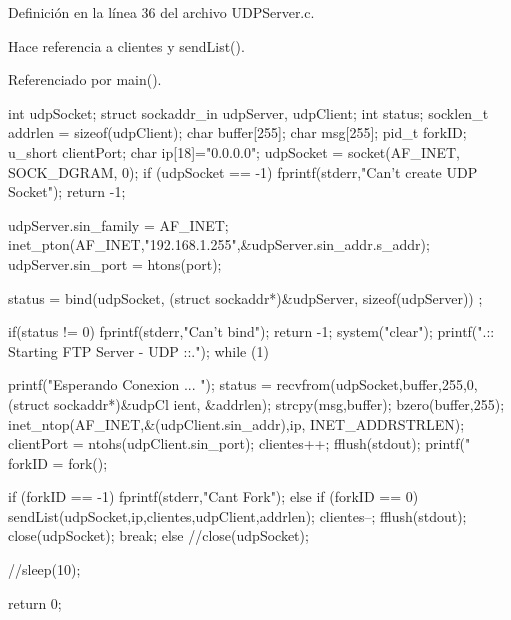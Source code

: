 Definición en la línea 36 del archivo UDPServer.c.



Hace referencia a clientes y sendList().



Referenciado por main().


\begin{DoxyCode}
                                       {
        int udpSocket;
        struct sockaddr_in udpServer, udpClient;
        int status;
        socklen_t addrlen = sizeof(udpClient);
        char buffer[255];
        char msg[255];
        pid_t forkID;
        u_short clientPort;
        char ip[18]="0.0.0.0";  
        udpSocket = socket(AF_INET, SOCK_DGRAM, 0);
        if (udpSocket == -1) {
                fprintf(stderr,"Can't create UDP Socket");
                return -1;
        }


        udpServer.sin_family = AF_INET;
        inet_pton(AF_INET,"192.168.1.255",&udpServer.sin_addr.s_addr);
        udpServer.sin_port = htons(port);
        
        status = bind(udpSocket, (struct sockaddr*)&udpServer, sizeof(udpServer))
      ;
        
        if(status != 0) { 
                fprintf(stderr,"Can't bind");
                return -1;
        }
        system("clear");
        printf(".:: Starting FTP  Server - UDP ::.\n\n");
        while (1){      
                printf("Esperando Conexion ... \n");
                status = recvfrom(udpSocket,buffer,255,0,(struct sockaddr*)&udpCl
      ient, &addrlen);
                strcpy(msg,buffer);
                bzero(buffer,255);              
                inet_ntop(AF_INET,&(udpClient.sin_addr),ip, INET_ADDRSTRLEN);
                clientPort = ntohs(udpClient.sin_port);
                clientes++;
                fflush(stdout);
                printf("%
                forkID = fork();
                
                if (forkID == -1) {
                        fprintf(stderr,"Cant Fork\n");
                } else if (forkID == 0) {
                        sendList(udpSocket,ip,clientes,udpClient,addrlen);
                        clientes--;
                        fflush(stdout);
                        close(udpSocket);
                        break;
                } else {
                        //close(udpSocket);
                } 

                //sleep(10);
        }
        return 0;
}
\end{DoxyCode}
